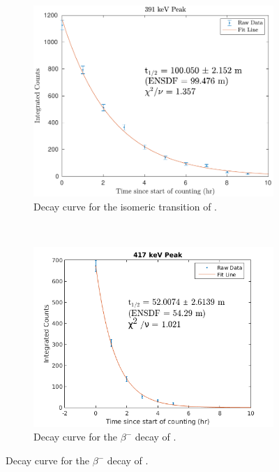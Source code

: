 \documentclass[5p]{elsarticle}
\begin{document}
\begin{figure}
\begin{subfigure}[t]{0.49\textwidth}
        \includegraphics[scale=0.6]{./figures/391keV_curve_new.pdf}
        \caption{ Decay curve for the isomeric transition of .}
        \label{fig:decay_curve_391}
    \end{subfigure}%
    \\
    \begin{subfigure}[t]{0.49\textwidth}
        \centering
        \includegraphics[scale=0.6]{./figures/417keV_curve2.png}
        \caption{Decay curve for the $\beta^-$ decay of .}
                \label{fig:decay_curve_417}
    \end{subfigure}

\end{figure}
\end{document}
